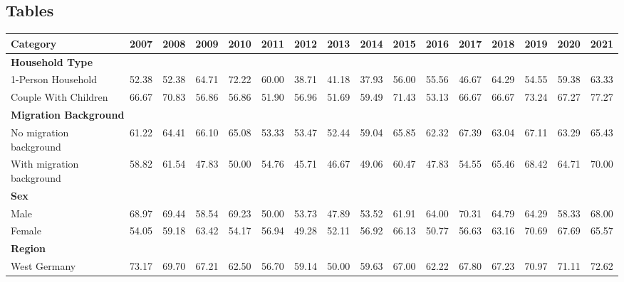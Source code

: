 
\renewcommand{\thetable}{\thesection \arabic{table}}
\setcounter{table}{0}

\begin{landscape}
\renewcommand{\arraystretch}{0.8}
\section{Tables} \label{appendix:tables}
\begin{table}[H]
\setlength{\tabcolsep}{4pt} %
\small
\centering
\begin{tabular}{lccccccccccccccc}
\toprule
Category & 2007 & 2008 & 2009 & 2010 & 2011 & 2012 & 2013 & 2014 & 2015 & 2016 & 2017 & 2018 & 2019 & 2020 & 2021 \\
\midrule
\multicolumn{16}{l}{\textbf{Household Type}} \\
1-Person Household      & 52.38 & 52.38 & 64.71 & 72.22 & 60.00 & 38.71 & 41.18 & 37.93 & 56.00 & 55.56 & 46.67 & 64.29 & 54.55 & 59.38 & 63.33 \\
Couple With Children    & 66.67 & 70.83 & 56.86 & 56.86 & 51.90 & 56.96 & 51.69 & 59.49 & 71.43 & 53.13 & 66.67 & 66.67 & 73.24 & 67.27 & 77.27 \\
\midrule
\multicolumn{16}{l}{\textbf{Migration Background}} \\
No migration background   & 61.22 & 64.41 & 66.10 & 65.08 & 53.33 & 53.47 & 52.44 & 59.04 & 65.85 & 62.32 & 67.39 & 63.04 & 67.11 & 63.29 & 65.43 \\
With migration background & 58.82 & 61.54 & 47.83 & 50.00 & 54.76 & 45.71 & 46.67 & 49.06 & 60.47 & 47.83 & 54.55 & 65.46 & 68.42 & 64.71 & 70.00 \\
\midrule
\multicolumn{16}{l}{\textbf{Sex}} \\
Male   & 68.97 & 69.44 & 58.54 & 69.23 & 50.00 & 53.73 & 47.89 & 53.52 & 61.91 & 64.00 & 70.31 & 64.79 & 64.29 & 58.33 & 68.00 \\
Female & 54.05 & 59.18 & 63.42 & 54.17 & 56.94 & 49.28 & 52.11 & 56.92 & 66.13 & 50.77 & 56.63 & 63.16 & 70.69 & 67.69 & 65.57 \\
\midrule
\multicolumn{16}{l}{\textbf{Region}} \\
West Germany & 73.17 & 69.70 & 67.21 & 62.50 & 56.70 & 59.14 & 50.00 & 59.63 & 67.00 & 62.22 & 67.80 & 67.23 & 70.97 & 71.11 & 72.62 \\

\end{tabular}
\end{table}
\end{landscape}
